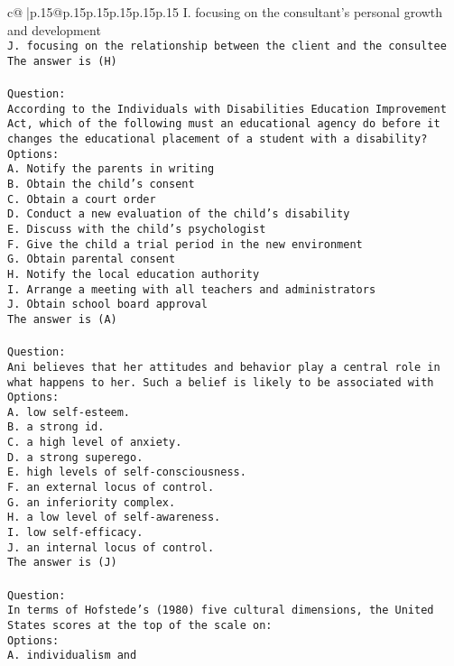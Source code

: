 \documentclass{article}
\begin{document}
{\begin{supertabular}{c@{$\;$}|p{.15\linewidth}@{}p{.15\linewidth}p{.15\linewidth}p{.15\linewidth}p{.15\linewidth}p{.15\linewidth}}
{{{I. focusing on the consultant's personal growth and development\\ \tt J. focusing on the relationship between the client and the consultee\\ \tt The answer is (H)\\ \tt \\ \tt Question:\\ \tt According to the Individuals with Disabilities Education Improvement Act, which of the following must an educational agency do before it changes the educational placement of a student with a disability?\\ \tt Options:\\ \tt A. Notify the parents in writing\\ \tt B. Obtain the child's consent\\ \tt C. Obtain a court order\\ \tt D. Conduct a new evaluation of the child's disability\\ \tt E. Discuss with the child's psychologist\\ \tt F. Give the child a trial period in the new environment\\ \tt G. Obtain parental consent\\ \tt H. Notify the local education authority\\ \tt I. Arrange a meeting with all teachers and administrators\\ \tt J. Obtain school board approval\\ \tt The answer is (A)\\ \tt \\ \tt Question:\\ \tt Ani believes that her attitudes and behavior play a central role in what happens to her. Such a belief is likely to be associated with\\ \tt Options:\\ \tt A. low self-esteem.\\ \tt B. a strong id.\\ \tt C. a high level of anxiety.\\ \tt D. a strong superego.\\ \tt E. high levels of self-consciousness.\\ \tt F. an external locus of control.\\ \tt G. an inferiority complex.\\ \tt H. a low level of self-awareness.\\ \tt I. low self-efficacy.\\ \tt J. an internal locus of control.\\ \tt The answer is (J)\\ \tt \\ \tt Question:\\ \tt In terms of Hofstede’s (1980) five cultural dimensions, the United States scores at the top of the scale on:\\ \tt Options:\\ \tt A. individualism and }}}
\end{supertabular}}
\end{document}
